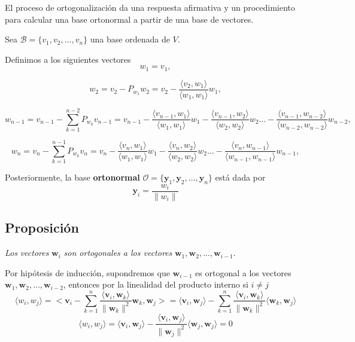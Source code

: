 \documentclass[
]{article}
\begin{document}
El proceso de ortogonalización da una respuesta afirmativa y un
procedimiento para calcular una base ortonormal a partir de una base de
vectores.

Sea \(\mathcal{B}=\{v_1,v_2,\ldots,v_n\}\) una base ordenada de \(V\).

Definimos a los siguientes vectores \[
w_1=v_1,
\]

\[
w_2 = v_2 - P_{w_1}w_2 = v_2 - \frac{\langle v_2,w_1 \rangle}{\langle w_1,w_1 \rangle}w_1,
\]

\[
w_{n-1} = v_{n-1} - \sum^{n-2}_{k=1} P_{w_k}v_{n-1} = v_{n-1} - \frac{\langle v_{n-1},w_1 \rangle}{\langle w_1,w_1 \rangle}w_1- \frac{\langle v_{n-1},w_2 \rangle}{\langle w_2,w_2 \rangle}w_2 \ldots - \frac{\langle v_{n-1},w_{n-2} \rangle}{\langle w_{n-2},w_{n-2} \rangle}w_{n-2},
\]

\[
w_{n} = v_{n} - \sum^{n-1}_{k=1} P_{w_k}v_{n} = v_{n} - \frac{\langle v_{n},w_1 \rangle}{\langle w_1,w_1 \rangle}w_1- \frac{\langle v_{n},w_2 \rangle}{\langle w_2,w_2 \rangle}w_2 \ldots - \frac{\langle v_{n},w_{n-1} \rangle}{\langle w_{n-1},w_{n-1} \rangle}w_{n-1},
\]

Posteriormente, la base \textbf{ortonormal}
\(\mathcal{O}=\{\mathbf{y}_1,\mathbf{y}_2,\ldots , \mathbf{y}_n\}\) está
dada por \[
\mathbf{y}_i = \frac{w_i}{\|w_i\|}
\]

\hypertarget{proposiciuxf3n-2}{%
\subsection{Proposición}\label{proposiciuxf3n-2}}

\emph{Los} \emph{vectores} \(\mathbf{w}_i\) \emph{son ortogonales a los
vectores} \(\mathbf{w}_1,\mathbf{w}_2,\ldots,\mathbf{w}_{i-1}\).

Por hipótesis de inducción, supondremos que \(\mathbf{w}_{i-1}\) es
ortogonal a los vectores
\(\mathbf{w}_1,\mathbf{w}_2,\ldots,\mathbf{w}_{i-2}\), entonces por la
linealidad del producto interno si \(i\ne j\) \[
\langle w_i, w_j \rangle = \biggl< \mathbf{v}_{i} - \sum_{k=1}^{n} \frac{\langle \mathbf{v}_{i}, \mathbf{w}_{k} \rangle}{\|\mathbf{w}_k\|^2}\mathbf{w}_k,\mathbf{w}_j\biggr>= \langle \mathbf{v}_i, \mathbf{w}_j \rangle - \sum_{k=1}^n \frac{\langle \mathbf{v}_{i}, \mathbf{w}_{k} \rangle}{\|\mathbf{w}_k\|^2}\langle \mathbf{w}_k, \mathbf{w}_j \rangle
\] \[
\langle w_i, w_j \rangle = \langle \mathbf{v}_i, \mathbf{w}_j \rangle - 
 \frac{\langle \mathbf{v}_{i}, \mathbf{w}_{j} \rangle}{\|\mathbf{w}_j\|^2}\langle \mathbf{w}_j, \mathbf{w}_j \rangle=0
\]
\end{document}
